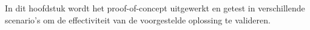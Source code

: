 
\chapter{}%
\label{ch:proofofconcept}

In dit hoofdstuk wordt het proof-of-concept uitgewerkt en getest in verschillende scenario’s om de effectiviteit van de voorgestelde oplossing te valideren.